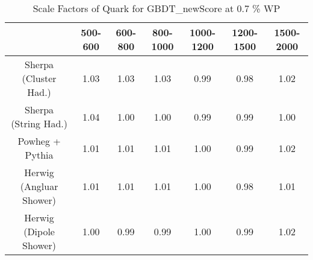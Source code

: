 \begin{table}
\centering
\caption{Scale Factors of Quark for GBDT_newScore at 0.7 \% WP}
\label{tab:SF_MC_GBDT_newScore_0.7_Quark}
\begin{tabular}{ccccccc}
\toprule
{} &  500-600 &  600-800 &  800-1000 &  1000-1200 &  1200-1500 &  1500-2000 \\
\midrule
Sherpa (Cluster Had.)   &     1.03 &     1.03 &      1.03 &       0.99 &       0.98 &       1.02 \\
Sherpa (String Had.)    &     1.04 &     1.00 &      1.00 &       0.99 &       0.99 &       1.00 \\
Powheg + Pythia         &     1.01 &     1.01 &      1.01 &       1.00 &       0.99 &       1.02 \\
Herwig (Angluar Shower) &     1.01 &     1.01 &      1.01 &       1.00 &       0.98 &       1.01 \\
Herwig (Dipole Shower)  &     1.00 &     0.99 &      0.99 &       1.00 &       0.99 &       1.02 \\
\bottomrule
\end{tabular}
\end{table}
